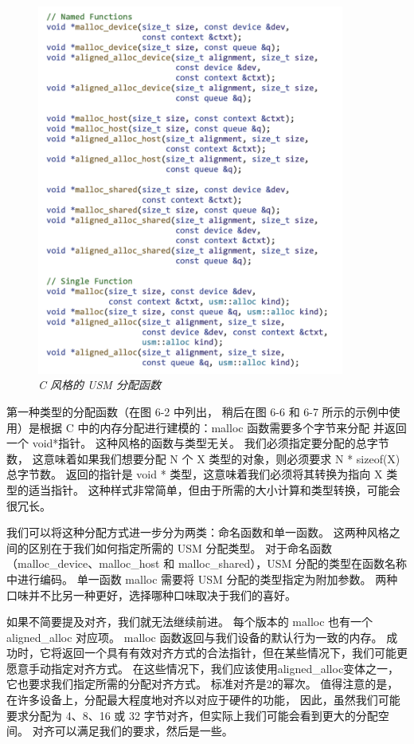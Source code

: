 \begin{figure}[H]
	\centering
	\includegraphics[width=0.9\textwidth]{figs/F6.2.png}
	\caption{\textit{C 风格的 USM 分配函数}}
\end{figure}

第一种类型的分配函数（在图 6-2 中列出，
稍后在图 6-6 和 6-7 所示的示例中使用）是根据 C 中的内存分配进行建模的：malloc 函数需要多个字节来分配
并返回一个 void*指针。 这种风格的函数与类型无关。 我们必须指定要分配的总字节数，
这意味着如果我们想要分配 N 个 X 类型的对象，则必须要求 N * sizeof(X) 总字节数。 
返回的指针是 void * 类型，这意味着我们必须将其转换为指向 X 类型的适当指针。
这种样式非常简单，但由于所需的大小计算和类型转换，可能会很冗长。

我们可以将这种分配方式进一步分为两类：命名函数和单一函数。 这两种风格之间的区别在于我们如何指定所需的 USM 分配类型。 
对于命名函数（malloc\_device、malloc\_host 和 malloc\_shared），USM 分配的类型在函数名称中进行编码。 
单一函数 malloc 需要将 USM 分配的类型指定为附加参数。 两种口味并不比另一种更好，选择哪种口味取决于我们的喜好。

如果不简要提及对齐，我们就无法继续前进。 每个版本的 malloc 也有一个aligned\_alloc 对应项。 
malloc 函数返回与我们设备的默认行为一致的内存。 
成功时，它将返回一个具有有效对齐方式的合法指针，但在某些情况下，我们可能更愿意手动指定对齐方式。 
在这些情况下，我们应该使用aligned\_alloc变体之一，它也要求我们指定所需的分配对齐方式。 
标准对齐是2的幂次。 值得注意的是，在许多设备上，分配最大程度地对齐以对应于硬件的功能，
因此，虽然我们可能要求分配为 4、8、16 或 32 字节对齐，但实际上我们可能会看到更大的分配空间。 
对齐可以满足我们的要求，然后是一些。

